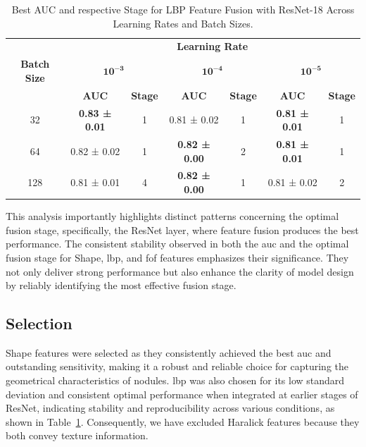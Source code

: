\begin{table}[htbp]
  \centering
  \caption[Best AUC and Stage for LBP Fusion]{Best AUC and respective Stage for LBP Feature Fusion with ResNet-18 Across Learning Rates and Batch Sizes.}
  \label{tab:lbp_hyperparam}
  \begin{tabular}{@{} c *{3}{cc} @{}}
    \toprule
    & \multicolumn{6}{c}{\textbf{Learning Rate}} \\
    \cmidrule(lr){2-7}
    \textbf{Batch Size}
      & \multicolumn{2}{c}{\(\mathbf{10^{-3}}\)}
      & \multicolumn{2}{c}{\(\mathbf{10^{-4}}\)}
      & \multicolumn{2}{c}{\(\mathbf{10^{-5}}\)} \\
    \cmidrule(lr){2-3} \cmidrule(lr){4-5} \cmidrule(lr){6-7}
    & \textbf{AUC} & \textbf{Stage}
      & \textbf{AUC} & \textbf{Stage}
      & \textbf{AUC} & \textbf{Stage} \\
    \midrule
    32  
      & \textbf{0.83 ± 0.01} & 1 
      & 0.81 ± 0.02 & 1 
      & \textbf{0.81 ± 0.01} & 1 \\
    64  
      & 0.82 ± 0.02 & 1 
      & \textbf{0.82 ± 0.00} & 2 
      & \textbf{0.81 ± 0.01} & 1 \\
    128 
      & 0.81 ± 0.01 & 4 
      & \textbf{0.82 ± 0.00} & 1 
      & 0.81 ± 0.02 & 2 \\
    \bottomrule
  \end{tabular}
\end{table}

This analysis importantly highlights distinct patterns concerning the optimal fusion stage, specifically, the ResNet layer, where feature fusion produces the best performance. The consistent stability observed in both the \ac{auc} and the optimal fusion stage for Shape, \ac{lbp}, and \ac{fof} features emphasizes their significance. They not only deliver strong performance but also enhance the clarity of model design by reliably identifying the most effective fusion stage.

\FloatBarrier

\subsection{Selection}
Shape features were selected as they consistently achieved the best \ac{auc} and outstanding sensitivity, making it a robust and reliable choice for capturing the geometrical characteristics of nodules.
\ac{lbp} was also chosen for its low standard deviation and consistent optimal performance when integrated at earlier stages of ResNet, indicating stability and reproducibility across various conditions, as shown in Table~\ref{tab:lbp_hyperparam}. Consequently, we have excluded Haralick features because they both convey texture information.

